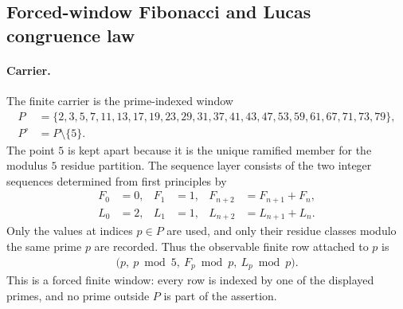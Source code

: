
\subsection{Forced-window Fibonacci and Lucas congruence law}
\label{sec:window6-fib-entry-point-fermat-congruence-law}

\paragraph{Carrier.}
The finite carrier is the prime-indexed window
$$
\begin{aligned}
P &= \{2,3,5,7,11,13,17,19,23,29,31,37,41,43,47,53,59,61,67,71,73,79\},\\
P^{\circ} &= P\setminus\{5\}.
\end{aligned}
$$
The point $5$ is kept apart because it is the unique ramified member for the modulus $5$ residue partition. The sequence layer consists of the two integer sequences determined from first principles by
$$
\begin{aligned}
F_0 &= 0, & F_1 &= 1, & F_{n+2} &= F_{n+1}+F_n,\\
L_0 &= 2, & L_1 &= 1, & L_{n+2} &= L_{n+1}+L_n.
\end{aligned}
$$
Only the values at indices $p\in P$ are used, and only their residue classes modulo the same prime $p$ are recorded. Thus the observable finite row attached to $p$ is
$$
\begin{aligned}
\bigl(p,\ p\bmod 5,\ F_p\bmod p,\ L_p\bmod p\bigr).
\end{aligned}
$$
This is a forced finite window: every row is indexed by one of the displayed primes, and no prime outside $P$ is part of the assertion.

